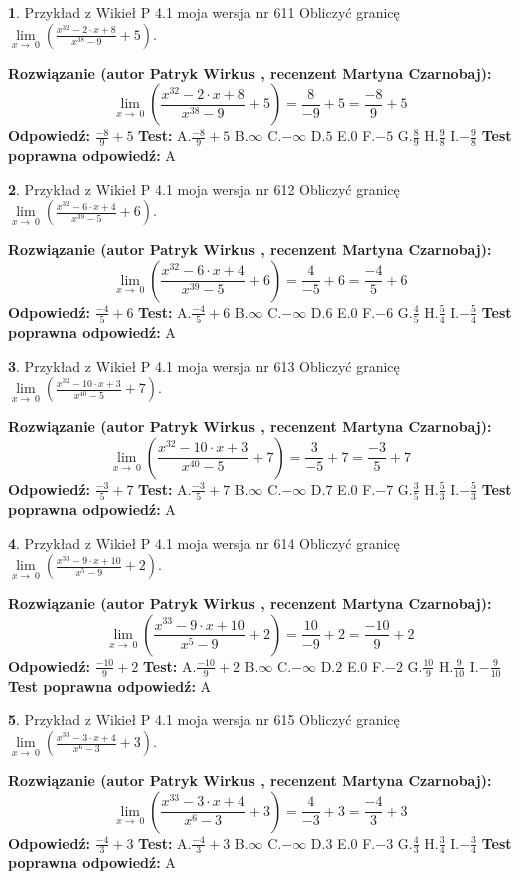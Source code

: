 \documentclass[12pt, a4paper]{article}
\theoremstyle{definition} %
\newtheorem{zad}{}
\newcommand{\zadStart}[1]{\begin{zad}#1\newline}
\newcommand{\zadStop}{\end{zad}}
\newcommand{\rozwStart}[2]{\noindent \textbf{Rozwiązanie (autor #1 , recenzent #2): }\newline}
\newcommand{\rozwStop}{\newline}
\newcommand{\odpStart}{\noindent \textbf{Odpowiedź:}\newline}
\newcommand{\odpStop}{\newline}
\newcommand{\testStart}{\noindent \textbf{Test:}\newline}
\newcommand{\testStop}{\newline}
\newcommand{\kluczStart}{\noindent \textbf{Test poprawna odpowiedź:}\newline}
\newcommand{\kluczStop}{\newline}
\begin{document}
\zadStart{Przykład z Wikieł P 4.1 moja wersja nr 611}
Obliczyć granicę $\lim\limits_{x\to\ 0}(\frac{x^{32}-2 \cdot x +8}{x^{38}-9}+5)$.
\zadStop
\rozwStart{Patryk Wirkus}{Martyna Czarnobaj}
$$\lim\limits_{x\to\ 0}(\frac{x^{32}-2 \cdot x +8}{x^{38}-9}+5)=\frac{8}{-9}+5=\frac{-8}{9}+5$$
\rozwStop
\odpStart
$\frac{-8}{9}+5$
\odpStop
\testStart
A.$\frac{-8}{9}+5$
B.$\infty$
C.$-\infty$
D.$5$
E.$0$
F.$-5$
G.$\frac{8}{9}$
H.$\frac{9}{8}$
I.$-\frac{9}{8}$
\testStop
\kluczStart
A
\kluczStop



\zadStart{Przykład z Wikieł P 4.1 moja wersja nr 612}
Obliczyć granicę $\lim\limits_{x\to\ 0}(\frac{x^{32}-6 \cdot x +4}{x^{39}-5}+6)$.
\zadStop
\rozwStart{Patryk Wirkus}{Martyna Czarnobaj}
$$\lim\limits_{x\to\ 0}(\frac{x^{32}-6 \cdot x +4}{x^{39}-5}+6)=\frac{4}{-5}+6=\frac{-4}{5}+6$$
\rozwStop
\odpStart
$\frac{-4}{5}+6$
\odpStop
\testStart
A.$\frac{-4}{5}+6$
B.$\infty$
C.$-\infty$
D.$6$
E.$0$
F.$-6$
G.$\frac{4}{5}$
H.$\frac{5}{4}$
I.$-\frac{5}{4}$
\testStop
\kluczStart
A
\kluczStop



\zadStart{Przykład z Wikieł P 4.1 moja wersja nr 613}
Obliczyć granicę $\lim\limits_{x\to\ 0}(\frac{x^{32}-10 \cdot x +3}{x^{40}-5}+7)$.
\zadStop
\rozwStart{Patryk Wirkus}{Martyna Czarnobaj}
$$\lim\limits_{x\to\ 0}(\frac{x^{32}-10 \cdot x +3}{x^{40}-5}+7)=\frac{3}{-5}+7=\frac{-3}{5}+7$$
\rozwStop
\odpStart
$\frac{-3}{5}+7$
\odpStop
\testStart
A.$\frac{-3}{5}+7$
B.$\infty$
C.$-\infty$
D.$7$
E.$0$
F.$-7$
G.$\frac{3}{5}$
H.$\frac{5}{3}$
I.$-\frac{5}{3}$
\testStop
\kluczStart
A
\kluczStop



\zadStart{Przykład z Wikieł P 4.1 moja wersja nr 614}
Obliczyć granicę $\lim\limits_{x\to\ 0}(\frac{x^{33}-9 \cdot x +10}{x^{5}-9}+2)$.
\zadStop
\rozwStart{Patryk Wirkus}{Martyna Czarnobaj}
$$\lim\limits_{x\to\ 0}(\frac{x^{33}-9 \cdot x +10}{x^{5}-9}+2)=\frac{10}{-9}+2=\frac{-10}{9}+2$$
\rozwStop
\odpStart
$\frac{-10}{9}+2$
\odpStop
\testStart
A.$\frac{-10}{9}+2$
B.$\infty$
C.$-\infty$
D.$2$
E.$0$
F.$-2$
G.$\frac{10}{9}$
H.$\frac{9}{10}$
I.$-\frac{9}{10}$
\testStop
\kluczStart
A
\kluczStop



\zadStart{Przykład z Wikieł P 4.1 moja wersja nr 615}
Obliczyć granicę $\lim\limits_{x\to\ 0}(\frac{x^{33}-3 \cdot x +4}{x^{6}-3}+3)$.
\zadStop
\rozwStart{Patryk Wirkus}{Martyna Czarnobaj}
$$\lim\limits_{x\to\ 0}(\frac{x^{33}-3 \cdot x +4}{x^{6}-3}+3)=\frac{4}{-3}+3=\frac{-4}{3}+3$$
\rozwStop
\odpStart
$\frac{-4}{3}+3$
\odpStop
\testStart
A.$\frac{-4}{3}+3$
B.$\infty$
C.$-\infty$
D.$3$
E.$0$
F.$-3$
G.$\frac{4}{3}$
H.$\frac{3}{4}$
I.$-\frac{3}{4}$
\testStop
\kluczStart
A
\kluczStop
\end{document}
